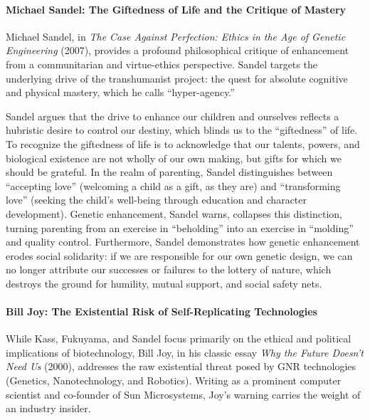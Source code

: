 \paragraph{Michael Sandel: The Giftedness of Life and the Critique of
Mastery}\label{michael-sandel-the-giftedness-of-life-and-the-critique-of-mastery}

Michael Sandel, in \emph{The Case Against Perfection: Ethics in the Age
of Genetic Engineering} (2007), provides a profound philosophical
critique of enhancement from a communitarian and virtue-ethics
perspective. Sandel targets the underlying drive of the transhumanist
project: the quest for absolute cognitive and physical mastery, which he
calls ``hyper-agency.''

Sandel argues that the drive to enhance our children and ourselves
reflects a hubristic desire to control our destiny, which blinds us to
the ``giftedness'' of life. To recognize the giftedness of life is to
acknowledge that our talents, powers, and biological existence are not
wholly of our own making, but gifts for which we should be grateful. In
the realm of parenting, Sandel distinguishes between ``accepting love''
(welcoming a child as a gift, as they are) and ``transforming love''
(seeking the child's well-being through education and character
development). Genetic enhancement, Sandel warns, collapses this
distinction, turning parenting from an exercise in ``beholding'' into an
exercise in ``molding'' and quality control. Furthermore, Sandel
demonstrates how genetic enhancement erodes social solidarity: if we are
responsible for our own genetic design, we can no longer attribute our
successes or failures to the lottery of nature, which destroys the
ground for humility, mutual support, and social safety nets.

\paragraph{Bill Joy: The Existential Risk of Self-Replicating
Technologies}\label{bill-joy-the-existential-risk-of-self-replicating-technologies}

While Kass, Fukuyama, and Sandel focus primarily on the ethical and
political implications of biotechnology, Bill Joy, in his classic essay
\emph{Why the Future Doesn't Need Us} (2000), addresses the raw
existential threat posed by GNR technologies (Genetics, Nanotechnology,
and Robotics). Writing as a prominent computer scientist and co-founder
of Sun Microsystems, Joy's warning carries the weight of an industry
insider.


